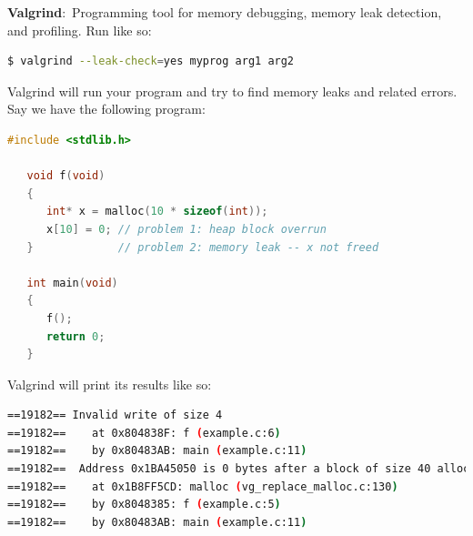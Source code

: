 \documentclass[nobib]{tufte-handout}
\newcommand{\defn}[2]{\noindent\textbf{#1}:\ #2}
\begin{document}
\defn{Valgrind}{Programming tool for 
memory debugging, memory leak detection, and profiling.}
Run like so:
\begin{lstlisting}[language=bash,caption=valgrind]
   $ valgrind --leak-check=yes myprog arg1 arg2
\end{lstlisting}
Valgrind will run your program and try to find memory leaks and 
related errors. Say we have the following program: 
\begin{lstlisting}[language=C,caption=valgrind example]
   #include <stdlib.h>

   void f(void)
   {
      int* x = malloc(10 * sizeof(int));
      x[10] = 0; // problem 1: heap block overrun
   }             // problem 2: memory leak -- x not freed
 
   int main(void)
   {
      f();
      return 0;
   }
\end{lstlisting}
Valgrind will print its results like so:
\begin{lstlisting}[language=bash,caption=valgrind]
==19182== Invalid write of size 4
==19182==    at 0x804838F: f (example.c:6)
==19182==    by 0x80483AB: main (example.c:11)
==19182==  Address 0x1BA45050 is 0 bytes after a block of size 40 allocd
==19182==    at 0x1B8FF5CD: malloc (vg_replace_malloc.c:130)
==19182==    by 0x8048385: f (example.c:5)
==19182==    by 0x80483AB: main (example.c:11)
\end{lstlisting}
\end{document}
